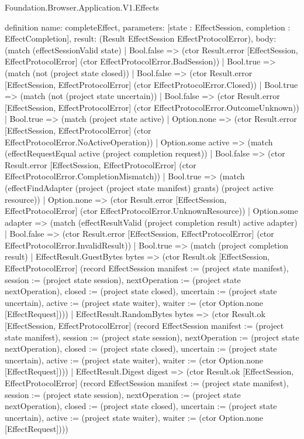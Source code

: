 \begin{lexlean}{Foundation.Browser.Application.V1.Effects}
\begin{semanticmodule}
definition{
  name: completeEffect,
  parameters: [state : EffectSession, completion : EffectCompletion],
  result: (Result EffectSession EffectProtocolError),
  body: (match (effectSessionValid state)
    | Bool.false => (ctor Result.error [EffectSession, EffectProtocolError] (ctor EffectProtocolError.BadSession))
    | Bool.true => (match (not (project state closed))
      | Bool.false => (ctor Result.error [EffectSession, EffectProtocolError] (ctor EffectProtocolError.Closed))
      | Bool.true => (match (not (project state uncertain))
        | Bool.false => (ctor Result.error [EffectSession, EffectProtocolError] (ctor EffectProtocolError.OutcomeUnknown))
        | Bool.true => (match (project state active)
          | Option.none => (ctor Result.error [EffectSession, EffectProtocolError] (ctor EffectProtocolError.NoActiveOperation))
          | Option.some active => (match (effectRequestEqual active (project completion request))
            | Bool.false => (ctor Result.error [EffectSession, EffectProtocolError] (ctor EffectProtocolError.CompletionMismatch))
            | Bool.true => (match (effectFindAdapter (project (project state manifest) grants) (project active resource))
              | Option.none => (ctor Result.error [EffectSession, EffectProtocolError] (ctor EffectProtocolError.UnknownResource))
              | Option.some adapter => (match (effectResultValid (project completion result) active adapter)
                | Bool.false => (ctor Result.error [EffectSession, EffectProtocolError] (ctor EffectProtocolError.InvalidResult))
                | Bool.true => (match (project completion result)
                  | EffectResult.GuestBytes bytes => (ctor Result.ok [EffectSession, EffectProtocolError] (record EffectSession {manifest := (project state manifest), session := (project state session), nextOperation := (project state nextOperation), closed := (project state closed), uncertain := (project state uncertain), active := (project state waiter), waiter := (ctor Option.none [EffectRequest])}))
                  | EffectResult.RandomBytes bytes => (ctor Result.ok [EffectSession, EffectProtocolError] (record EffectSession {manifest := (project state manifest), session := (project state session), nextOperation := (project state nextOperation), closed := (project state closed), uncertain := (project state uncertain), active := (project state waiter), waiter := (ctor Option.none [EffectRequest])}))
                  | EffectResult.Digest digest => (ctor Result.ok [EffectSession, EffectProtocolError] (record EffectSession {manifest := (project state manifest), session := (project state session), nextOperation := (project state nextOperation), closed := (project state closed), uncertain := (project state uncertain), active := (project state waiter), waiter := (ctor Option.none [EffectRequest])}))
}
\end{semanticmodule}
\end{lexlean}
